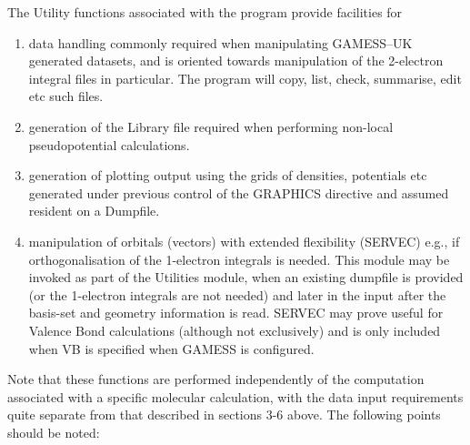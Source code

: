 \documentclass[11pt,fleqn]{article}
\begin{document}
The Utility functions associated with the program provide facilities for
\begin{enumerate}
\item data handling commonly required
when manipulating GAMESS--UK generated datasets, and is oriented towards
manipulation of the 2-electron integral files in particular. 
The program will copy, list, check, summarise, edit etc such files. 
\item  generation of the Library file required 
when performing non-local pseudopotential calculations.
\item generation of plotting output using the grids of 
densities, potentials etc generated under previous control
of the GRAPHICS directive and assumed resident on a Dumpfile.
\item manipulation of orbitals (vectors) with extended flexibility
(SERVEC) e.g., if orthogonalisation of the 1-electron integrals
is needed. This module may be invoked as part of the Utilities module,
when an existing dumpfile is provided (or the 1-electron integrals are
not needed) and later in the input after the basis-set and geometry
information is read.  SERVEC may prove useful for Valence Bond
calculations (although not exclusively) and is only included when VB is
specified when GAMESS is configured.
\end{enumerate}
Note that these
functions are performed independently of the computation 
associated with  a specific molecular calculation, 
with the data input requirements quite separate from that described
in sections 3-6 above. The following points should be noted:
\end{document}
